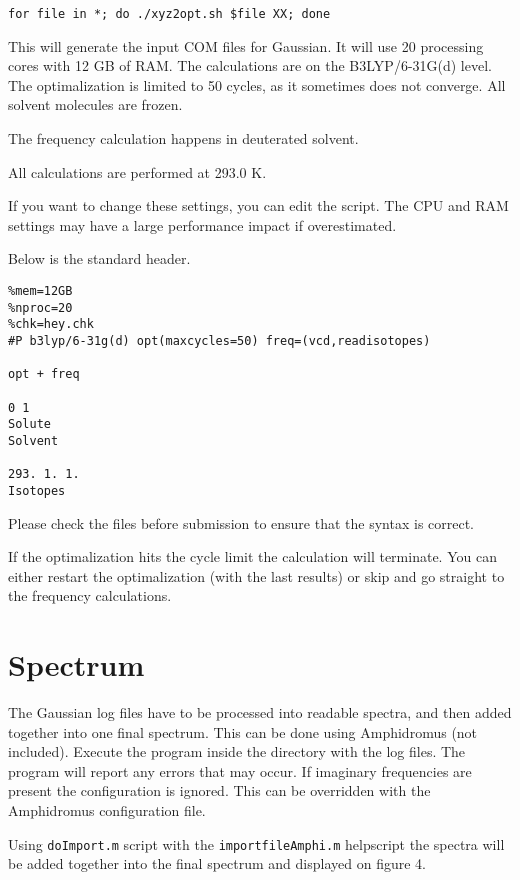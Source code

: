 \begin{lstlisting}[caption=XYZ to COM]
for file in *; do ./xyz2opt.sh $file XX; done
\end{lstlisting}

This will generate the input COM files for Gaussian. It will use 20 processing 
cores with 12 GB of RAM. The calculations are on the B3LYP/6-31G(d) level. 
The optimalization is limited to 50 cycles, as it sometimes does not converge.
All solvent molecules are frozen.

The frequency calculation happens in deuterated solvent.

All calculations are performed at 293.0 K.

\null

If you want to change these settings, you can edit the script. The CPU and RAM 
settings may have a large performance impact if overestimated.

Below is the standard header.
\begin{verbatim}
%mem=12GB
%nproc=20
%chk=hey.chk
#P b3lyp/6-31g(d) opt(maxcycles=50) freq=(vcd,readisotopes)

opt + freq

0 1
Solute
Solvent

293. 1. 1.
Isotopes

\end{verbatim}

Please check the files before submission to ensure that the syntax is correct. 

If the optimalization hits the cycle limit the calculation will terminate.
You can either restart the optimalization (with the last results) or skip and 
go straight to the frequency calculations.

\section{Spectrum}
The Gaussian log files have to be processed into readable spectra, and then 
added together into one final spectrum. This can be done using Amphidromus (not 
included). 
Execute the program inside the directory with the log files. The program will 
report any errors that may occur. If imaginary frequencies are present the 
configuration is ignored. This can be overridden with the Amphidromus 
configuration file.

Using \verb|doImport.m| script with the \verb|importfileAmphi.m| helpscript the 
spectra will be added together into the final spectrum and displayed on figure 
4.